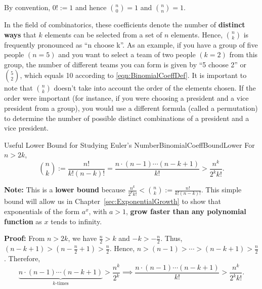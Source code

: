 \begin{rem} By convention, $0!:=1$ and hence $\binom{n}{0}=1$ and $ \binom{n}{n}=1$. 
    
\end{rem}

In the field of combinatorics, these coefficients denote the number of \textbf{distinct ways} that $k$ elements can be selected from a set of $n$ elements. Hence, $\binom{n}{k}$ is frequently pronounced as ``n choose k''.  As an example, if you have a group of five people $(n = 5)$ and you want to select a team of two people $(k = 2)$ from this group, the number of different teams you can form is given by ``5 choose 2'' or $\binom{5}{2}$, which equals 10 according to \eqref{eqn:BinomialCoeffDef}. It is important to note that  $\binom{n}{k}$ doesn't take into account the order of the elements chosen. If the order were important (for instance, if you were choosing a president and a vice president from a group), you would use a different formula (called a permutation) to determine the number of possible distinct combinations of a president and a vice president.

\bigskip

\begin{propColor}{Useful Lower Bound for Studying Euler's Number}{BinomialCoeffBoundLower}
For $n > 2k$,
\begin{equation}
    \label{eq:BinomialCoeffBoundLower}
    \binom{n}{k} := \frac{n!}{k!(n-k)!} = \frac {n \cdot (n-1)\cdots (n-k+1)}{k!} > \frac{n^k}{2^k k!}.
\end{equation} 

\bigskip 

\textbf{Note:} This is a \textbf{lower bound} because $\frac{n^k}{2^k k!} < \binom{n}{k} := \frac{n!}{k!(n-k)!}$. This simple bound will allow us in Chapter~\ref{sec:ExponentialGrowth} to show that exponentials of the form $a^x$, with $a>1$, \textbf{grow faster than any polynomial function} as $x$ tends to infinity.
\end{propColor}

\textbf{Proof:}  From $n > 2k$, we have $\frac{n}{2} > k$ and $-k > -\frac{n}{2} $. Thus, $(n-k+1) > (n - \frac{n}{2} +1) > \frac{n}{2}.$ Hence, $n > (n-1) > \cdots > (n-k+1) > \frac{n}{2}$. Therefore, 
$$
\underbrace{n \cdot (n-1)\cdots (n-k+1)}_{k\text{-times}} >  \frac{n^k}{2^k} \implies \frac {n \cdot (n-1)\cdots (n-k+1)}{k!} > \frac{n^k}{2^k k!}.$$

\Qed

